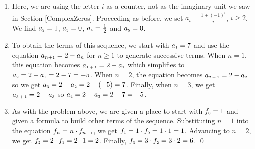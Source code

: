 \begin{ex}
\begin{enumerate}
\item  Here, we are using the letter $i$ as a counter, not as the imaginary unit we saw in Section \ref{ComplexZeros}.  Proceeding as before, we set $a_{i} = \frac{1 + (-1)^{i}}{i}$, $i \geq 2$.  We find $a_{\text{\tiny$2$}} = 1$, $a_{\text{\tiny$3$}} = 0$, $a_{\text{\tiny$4$}} = \frac{1}{2}$ and $a_{\text{\tiny$5$}} = 0$.  

\item  To obtain the terms of this sequence, we start with $a_{\text{\tiny$1$}} = 7$ and use the equation $a_{n \text{+\tiny$1$}} = 2 - a_{n}$ for $n \geq 1$ to generate successive terms.  When $n = 1$, this equation becomes $a_{\text{\tiny$1 + 1$}} = 2 - a_{\text{\tiny$1$}}$ which simplifies to $a_{\text{\tiny$2$}} = 2 - a_{\text{\tiny$1$}} = 2 - 7 = -5$.  When $n = 2$, the equation becomes $a_{\text{\tiny$2 + 1$}} = 2 - a_{\text{\tiny$2$}}$ so we get $a_{\text{\tiny$3$}} = 2 - a_{\text{\tiny$2$}} = 2 - (-5) = 7$.  Finally, when $n = 3$, we get $a_{\text{\tiny$3 + 1$}} = 2 - a_{\text{\tiny$3$}}$ so $a_{\text{\tiny$4$}} = 2 - a_{\text{\tiny$3$}} = 2-7 = -5$.  

\item  As with the problem above, we are given a place to start with $f_{\text{\tiny$0$}} = 1$ and given a formula to build other terms of the sequence.  Substituting $n = 1$ into the equation $f_{n} = n \cdot f_{n-\text{\tiny$1$}}$, we get $f_{\text{\tiny$1$}} = 1 \cdot f_{\text{\tiny$0$}} = 1 \cdot 1 = 1$.  Advancing to $n = 2$, we get $f_{\text{\tiny$2$}} = 2 \cdot f_{\text{\tiny$1$}} = 2 \cdot 1 = 2$.  Finally, $f_{\text{\tiny$3$}} = 3 \cdot f_{\text{\tiny$2$}} = 3 \cdot 2 = 6$.  \qed

\end{enumerate}

\end{ex}

